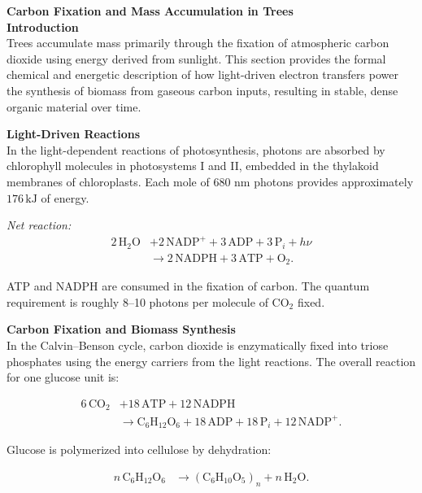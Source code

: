 \begin{technical}
{\Large\textbf{Carbon Fixation and Mass Accumulation in Trees}}\\[0.7em]

\noindent\textbf{Introduction}\\[0.5em]
Trees accumulate mass primarily through the fixation of atmospheric carbon dioxide using energy derived from sunlight. This section provides the formal chemical and energetic description of how light-driven electron transfers power the synthesis of biomass from gaseous carbon inputs, resulting in stable, dense organic material over time.

\noindent\textbf{Light-Driven Reactions}\\[0.5em]
In the light-dependent reactions of photosynthesis, photons are absorbed by chlorophyll molecules in photosystems I and II, embedded in the thylakoid membranes of chloroplasts. Each mole of 680 nm photons provides approximately \(176\,\mathrm{kJ}\) of energy.

\vspace{0.3em}
\noindent\textit{Net reaction:}
\begin{align}
2\,\mathrm{H}_2\mathrm{O} 
&+ 2\,\mathrm{NADP}^+ 
+ 3\,\mathrm{ADP} 
+ 3\,\mathrm{P}_i 
+ h\nu \nonumber \\
&\rightarrow 2\,\mathrm{NADPH} 
+ 3\,\mathrm{ATP} 
+ \mathrm{O}_2.
\end{align}

ATP and NADPH are consumed in the fixation of carbon. The quantum requirement is roughly 8–10 photons per molecule of \(\mathrm{CO}_2\) fixed.

\noindent\textbf{Carbon Fixation and Biomass Synthesis}\\[0.5em]
In the Calvin–Benson cycle, carbon dioxide is enzymatically fixed into triose phosphates using the energy carriers from the light reactions. The overall reaction for one glucose unit is:

\begin{align}
6\,\mathrm{CO}_2 
&+ 18\,\mathrm{ATP} 
+ 12\,\mathrm{NADPH} \nonumber \\
&\rightarrow \mathrm{C}_6\mathrm{H}_{12}\mathrm{O}_6 
+ 18\,\mathrm{ADP} 
+ 18\,\mathrm{P}_i 
+ 12\,\mathrm{NADP}^+.
\end{align}

Glucose is polymerized into cellulose by dehydration:

\begin{align}
n\,\mathrm{C}_6\mathrm{H}_{12}\mathrm{O}_6 
&\rightarrow (\mathrm{C}_6\mathrm{H}_{10}\mathrm{O}_5)_n 
+ n\,\mathrm{H}_2\mathrm{O}.
\end{align}


\end{technical}
